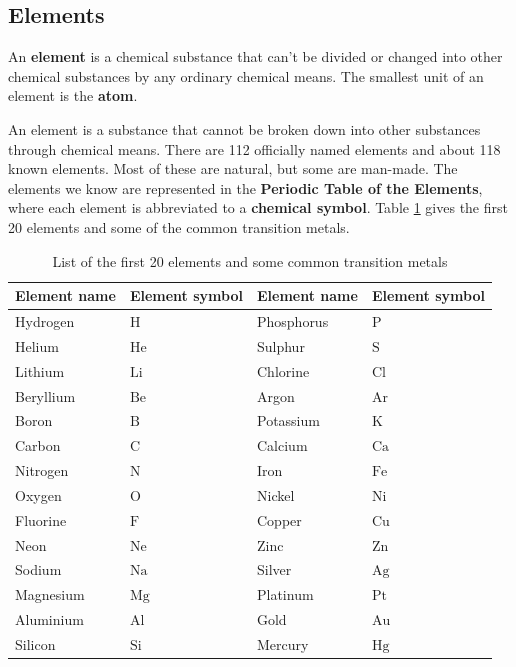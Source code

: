             \subsection*{Elements}
            \nopagebreak
        \label{m38708*id63302}An \textbf{element} is a chemical substance that can't be divided or changed into other chemical substances by any ordinary chemical means. The smallest unit of an element is the \textbf{atom}.\par 
\label{m38708*fhsst!!!underscore!!!id193}
{ \label{m38708*meaningfhsst!!!underscore!!!id193}
An element is a substance that cannot be broken down into other substances through chemical means.} 
        \label{m38708*id63334}There are 112 officially named elements and about 118 known elements. Most of these are natural, but some are man-made. The elements we know are represented in the \textbf{Periodic Table of the Elements}, where each element is abbreviated to a \textbf{chemical symbol}. Table \ref{tab:elements} gives the first 20 elements and some of the common transition metals.\par \label{m38708*eip-775}
\begin{table}[h!]
\label{tab:elements}
\begin{center}
\begin{tabular}{|l|l|l|l|}\hline
\textbf{Element name} & \textbf{Element symbol} & \textbf{Element name} & \textbf{Element symbol} \\ \hline
Hydrogen & $\text{H}$ & Phosphorus & $\text{P}$  \\ \hline
Helium & $\text{He}$ & Sulphur & $\text{S}$ \\ \hline
Lithium & $\text{Li}$ & Chlorine & $\text{Cl}$ \\ \hline
Beryllium & $\text{Be}$ & Argon & $\text{Ar}$ \\ \hline 
Boron & $\text{B}$ & Potassium & $\text{K}$ \\ \hline
Carbon & $\text{C}$ & Calcium & $\text{Ca}$ \\ \hline 
Nitrogen & $\text{N}$ & Iron & $\text{Fe}$ \\ \hline
Oxygen & $\text{O}$ & Nickel & $\text{Ni}$ \\ \hline 
Fluorine & $\text{F}$ & Copper & $\text{Cu}$ \\ \hline
Neon & $\text{Ne}$  & Zinc & $\text{Zn}$ \\ \hline
Sodium & $\text{Na}$  & Silver & $\text{Ag}$ \\ \hline
Magnesium & $\text{Mg}$  & Platinum & $\text{Pt}$ \\ \hline
Aluminium & $\text{Al}$ & Gold & $\text{Au}$ \\ \hline
Silicon & $\text{Si}$ & Mercury & $\text{Hg}$  \\ \hline
\end{tabular}
\end{center}
\caption{List of the first 20 elements and some common transition metals}
\end{table}
